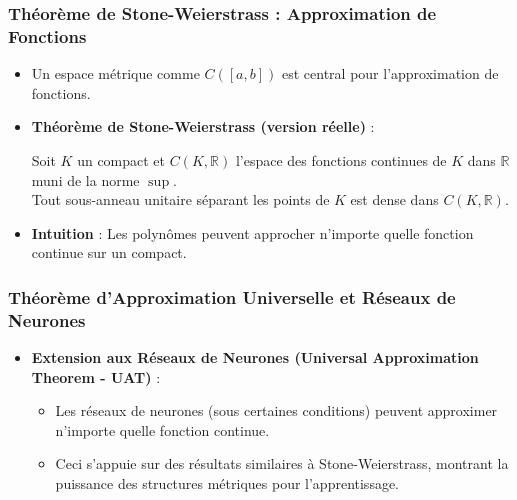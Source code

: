 \documentclass{beamer}
\begin{document}
\begin{frame}
	\frametitle{Théorème de Stone-Weierstrass : Approximation de Fonctions}
	\begin{itemize}
		\item Un espace métrique comme $C([a,b])$ est central pour l'approximation de fonctions.
		\item \textbf{Théorème de Stone-Weierstrass (version réelle)} :
		      \begin{block}{}
			      Soit $K$ un compact et $C(K, \mathbb{R})$ l'espace des fonctions continues de $K$ dans $\mathbb{R}$ muni de la norme $\sup$.\\
			      Tout sous-anneau unitaire séparant les points de $K$ est dense dans $C(K, \mathbb{R})$.
		      \end{block}
		\item \textbf{Intuition} : Les polynômes peuvent approcher n'importe quelle fonction continue sur un compact.
	\end{itemize}
\end{frame}

\begin{frame}
	\frametitle{Théorème d'Approximation Universelle et Réseaux de Neurones}
	\begin{itemize}
		\item \textbf{Extension aux Réseaux de Neurones (Universal Approximation Theorem - UAT)} :
		      \begin{itemize}
			      \item Les réseaux de neurones (sous certaines conditions) peuvent approximer n'importe quelle fonction continue.
			      \item Ceci s'appuie sur des résultats similaires à Stone-Weierstrass, montrant la puissance des structures métriques pour l'apprentissage.
		      \end{itemize}
	\end{itemize}
\end{frame}

\end{document}
